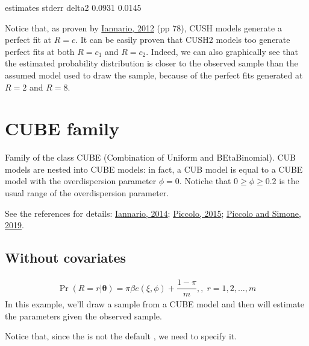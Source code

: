 \documentclass[letterpaper,10pt,english]{sphinxmanual}
\begin{document}
\noindent{}

\begin{sphinxVerbatim}[commandchars=\\\{\}]
     estimates  stderr
delta2  0.0931  0.0145
\end{sphinxVerbatim}

\sphinxAtStartPar
Notice that, as proven by \hyperlink{cite.references:id9}{Iannario, 2012} (pp 7\sphinxhyphen{}8), CUSH models
generate a perfect fit at \(R=c\). It can be easily proven that
CUSH2 models too generate perfect fits at both \(R=c_1\) and \(R=c_2\).
Indeed, we can also graphically see that the estimated probability distribution is
closer to the observed sample than the assumed model used to draw the sample, because
of the perfect fits generated at \(R=2\) and \(R=8\).


\section{CUBE family}
\label{\detokenize{manual:cube-family}}
\sphinxAtStartPar
Family of the class CUBE (Combination of Uniform and BEtaBinomial).
CUB models are nested into CUBE models: in fact, a CUB model is equal to
a CUBE model with the overdispersion parameter \(\phi=0\).
Notiche that \(0\geq\phi\geq0.2\) is the usual range of the overdispersion parameter.

\sphinxAtStartPar
See the references for details: \hyperlink{cite.references:id16}{Iannario, 2014}; \hyperlink{cite.references:id14}{Piccolo, 2015};
\hyperlink{cite.references:id3}{Piccolo and Simone, 2019}.


\subsection{Without covariates}
\label{\detokenize{manual:cube-without-covariates}}\label{\detokenize{manual:id31}}
\sphinxAtStartPar
{}
\begin{equation*}
\begin{split}\Pr(R=r|\pmb{\theta}) = \pi \beta e(\xi,\phi)+\dfrac{1-\pi}{m},
,\; r=1,2,\ldots,m\end{split}
\end{equation*}
\sphinxAtStartPar
In this example, we’ll draw a sample from a CUBE model and then
will estimate the parameters given the observed sample.

\sphinxAtStartPar
Notice that, since the  is not the default , we need to specify it.
\end{document}

